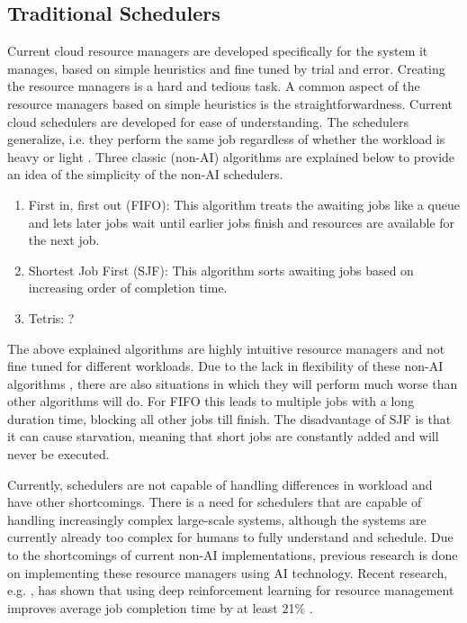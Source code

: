 \subsection{Traditional Schedulers}

Current cloud resource managers are developed specifically for the system it
manages, based on simple heuristics and fine tuned by trial and error.
Creating the resource managers is a hard and tedious task. A common aspect of
the resource managers based on simple heuristics is the straightforwardness.
Current cloud schedulers are developed for ease of understanding. The
schedulers generalize, i.e. they perform the same job regardless of whether
the workload is heavy or light \cite{mao2019}. Three classic (non-AI)
algorithms are explained below to provide an idea of the simplicity of the
non-AI schedulers.

\begin{enumerate}
\item First in, first out (FIFO): This algorithm treats the awaiting jobs like
    a queue and lets later jobs wait until earlier jobs finish and resources
    are available for the next job.
\item Shortest Job First (SJF): This algorithm sorts awaiting jobs based on
    increasing order of completion time.
\item Tetris: ? 
\end{enumerate}

The above explained algorithms are highly intuitive resource managers and not
fine tuned for different workloads. Due to the lack in flexibility of these
non-AI algorithms , there are also situations in which they will perform much
worse than other algorithms will do. For FIFO this leads to multiple jobs with
a long duration time, blocking all other jobs till finish. The disadvantage of
SJF is that it can cause starvation, meaning that short jobs are constantly
added and will never be executed.

Currently, schedulers are not capable of handling differences in workload and
have other shortcomings. There is a need for schedulers that are capable of
handling increasingly complex large-scale systems, although the systems are
currently already too complex for humans to fully understand and schedule. Due
to the shortcomings of current non-AI implementations, previous research is
done on implementing these resource managers using AI technology. Recent
research, e.g. , has shown that
using deep reinforcement learning for resource management improves average job
completion time by at least 21\% \cite{mao2019}.


